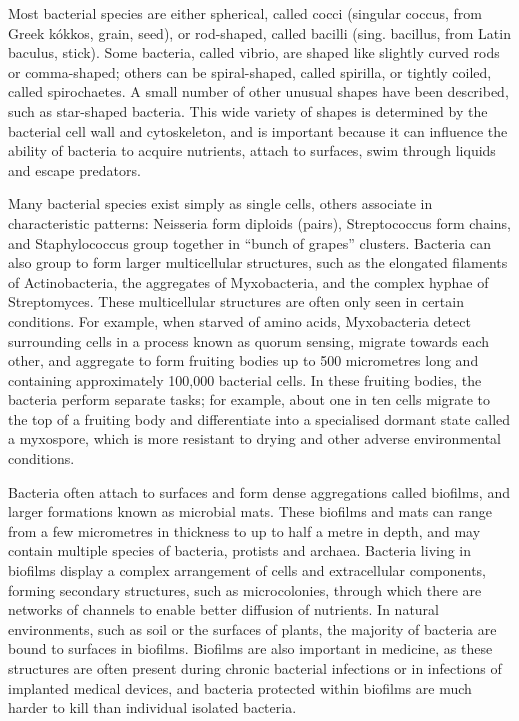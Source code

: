 Most bacterial species are either spherical, called cocci (singular coccus, from Greek kókkos, grain, seed), or rod-shaped, called bacilli (sing. bacillus, from Latin baculus, stick). Some bacteria, called vibrio, are shaped like slightly curved rods or comma-shaped; others can be spiral-shaped, called spirilla, or tightly coiled, called spirochaetes. A small number of other unusual shapes have been described, such as star-shaped bacteria. This wide variety of shapes is determined by the bacterial cell wall and cytoskeleton, and is important because it can influence the ability of bacteria to acquire nutrients, attach to surfaces, swim through liquids and escape predators.

Many bacterial species exist simply as single cells, others associate in characteristic patterns: Neisseria form diploids (pairs), Streptococcus form chains, and Staphylococcus group together in ``bunch of grapes'' clusters. Bacteria can also group to form larger multicellular structures, such as the elongated filaments of Actinobacteria, the aggregates of Myxobacteria, and the complex hyphae of Streptomyces. These multicellular structures are often only seen in certain conditions. For example, when starved of amino acids, Myxobacteria detect surrounding cells in a process known as quorum sensing, migrate towards each other, and aggregate to form fruiting bodies up to 500 micrometres long and containing approximately 100,000 bacterial cells. In these fruiting bodies, the bacteria perform separate tasks; for example, about one in ten cells migrate to the top of a fruiting body and differentiate into a specialised dormant state called a myxospore, which is more resistant to drying and other adverse environmental conditions.

Bacteria often attach to surfaces and form dense aggregations called biofilms, and larger formations known as microbial mats. These biofilms and mats can range from a few micrometres in thickness to up to half a metre in depth, and may contain multiple species of bacteria, protists and archaea. Bacteria living in biofilms display a complex arrangement of cells and extracellular components, forming secondary structures, such as microcolonies, through which there are networks of channels to enable better diffusion of nutrients. In natural environments, such as soil or the surfaces of plants, the majority of bacteria are bound to surfaces in biofilms. Biofilms are also important in medicine, as these structures are often present during chronic bacterial infections or in infections of implanted medical devices, and bacteria protected within biofilms are much harder to kill than individual isolated bacteria.

